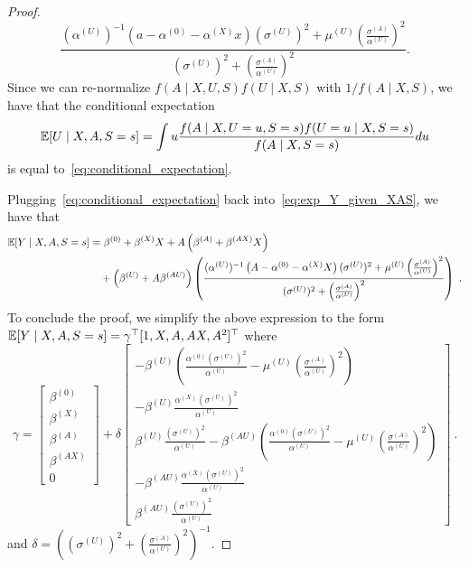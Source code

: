 \documentclass{article}
\begin{document}
\begin{proof}
    \begin{equation} \label{eq:conditional_expectation}
       \frac{(\alpha^{(U)})^{-1} \left(a - \alpha^{(0)} - \alpha^{(X)} x\right) (\sigma^{(U)})^2  +  \mu^{(U)} \left(\frac{\sigma^{(A)}}{\alpha^{(U)}}\right)^2}{(\sigma^{(U)})^2  +\left(\frac{\sigma^{(A)}}{\alpha^{(U)}}\right)^2}.
    \end{equation}
    Since we can re-normalize $f(A\mid X, U, S) f(U\mid X, S)$ with $1/f(A\mid X, S)$, we have that the conditional expectation 
    $$\mathbb{E}[U\mid X, A, S=s] = \int u \frac{f(A\mid X, U=u, S=s) f(U=u\mid X, S=s)}{f(A\mid X, S=s)} du$$
    is equal to~\eqref{eq:conditional_expectation}. 

    Plugging~\eqref{eq:conditional_expectation} back into~\eqref{eq:exp_Y_given_XAS}, we have that
    \begin{align*}
        \mathbb{E}[Y\mid X, A, S=s] & = \beta^{(0)} + \beta^{(X)} X + A  \left(\beta^{(A)} + \beta^{(AX)} X\right)  \\
        &\quad + \left(\beta^{(U)} + A \beta^{(AU)}\right ) \left( \frac{(\alpha^{(U)})^{-1} \left(A - \alpha^{(0)} - \alpha^{(X)} X\right) (\sigma^{(U)})^2  +  \mu^{(U)} \left(\frac{\sigma^{(A)}}{\alpha^{(U)}}\right)^2}{(\sigma^{(U)})^2  +\left(\frac{\sigma^{(A)}}{\alpha^{(U)}}\right)^2} \right)~.
    \end{align*}
    To conclude the proof, we simplify the above expression to the form $\mathbb{E}[Y\mid X, A, S=s]=\gamma^\top [1,X,A,AX, A^2]^\top$ where 
    \begin{equation*}
        \gamma = 
        \begin{bmatrix}
        \beta^{(0)} \\
        \beta^{(X)}\\
        \beta^{(A)} \\
        \beta^{(AX)} \\
        0
        \end{bmatrix}
        + 
        \delta 
        \begin{bmatrix}
        - \beta^{(U)} \left( \frac{\alpha^{(0)}(\sigma^{(U)})^{2} }{\alpha^{(U)}} - \mu^{(U)}\left(\frac{\sigma^{(A)}}{\alpha^{(U)}}\right)^2 \right) \\
        -  \beta^{(U)} \frac{\alpha^{(X)}(\sigma^{(U)})^{2}}{\alpha^{(U)}}  \\
        \beta^{(U)} \frac{(\sigma^{(U)})^2}{\alpha^{(U)}}  - \beta^{(AU)} \left( \frac{\alpha^{(0)}(\sigma^{(U)})^{2}}{\alpha^{(U)}} - \mu^{(U)}\left(\frac{\sigma^{(A)}}{\alpha^{(U)}}\right)^2 \right) \\
        - \beta^{(AU)}\frac{\alpha^{(X)} (\sigma^{(U)})^{2}}{\alpha^{(U)}}  \\[0.1cm]
        \beta^{(AU)}  \frac{(\sigma^{(U)})^2}{\alpha^{(U)}} 
        \end{bmatrix}~.
    \end{equation*}
    and $\delta =\left( (\sigma^{(U)})^2  +\left(\frac{\sigma^{(A)}}{\alpha^{(U)}}\right)^2\right)^{-1}$. 
\end{proof}
\end{document}
